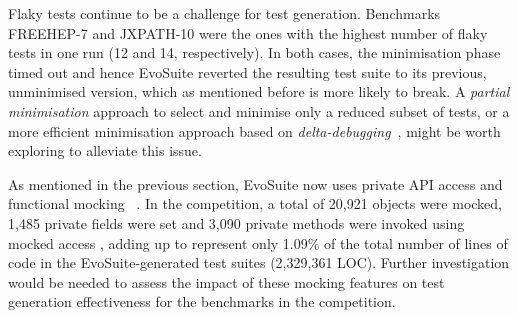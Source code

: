 \documentclass[10pt,conference]{IEEEtran}
\newcommand{\TODO}[1]{\sethlcolor{yellow}\textbf{\textcolor{ScarletRed}{\hl{TODO: #1}}}\xspace}
\newcommand{\TODO}[1]{}
\newcommand{\EVOSUITE}{{\sc EvoSuite}\xspace}
\begin{document}

Flaky tests continue to be a challenge for test generation. Benchmarks
FREEHEP-7 and JXPATH-10 were the ones with the highest number of flaky
tests in one run (12 and 14, respectively). In both cases, the
minimisation phase timed out and hence \EVOSUITE reverted the
resulting test suite to its previous, unminimised version, which as
mentioned before is more likely to break. A \textit{partial
  minimisation} approach to select and minimise only a reduced subset
of tests, or a more efficient minimisation approach based on
\textit{delta-debugging}~\cite{LOZCM07}, might be worth exploring to
alleviate this issue.

As mentioned in the previous section, \EVOSUITE now uses private
API access and functional mocking%
~\cite{ICST_Mocking17}. In the competition, a total of 20,921
objects were mocked, 1,485 private fields were set and 3,090 private methods
were invoked using mocked access%
, adding up to represent only 1.09\% of the total number of lines of
code in the \EVOSUITE-generated test suites (2,329,361 LOC). Further
investigation would be needed to assess the impact of these mocking
features on test generation effectiveness for the benchmarks in the
competition.
\end{document}
